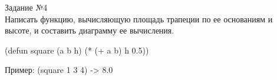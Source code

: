 \newpage
\vspace*{10mm}
{\LARGE Задание №4}\\

Написать функцию, вычисляющую площадь трапеции по ее основаниям и высоте, и составить диаграмму ее вычисления.

(defun square (a b h) (* (+ a b) h 0.5))

Пример: (square 1 3 4) -> 8.0
\begin{figure}[ht!]
\end{figure}
